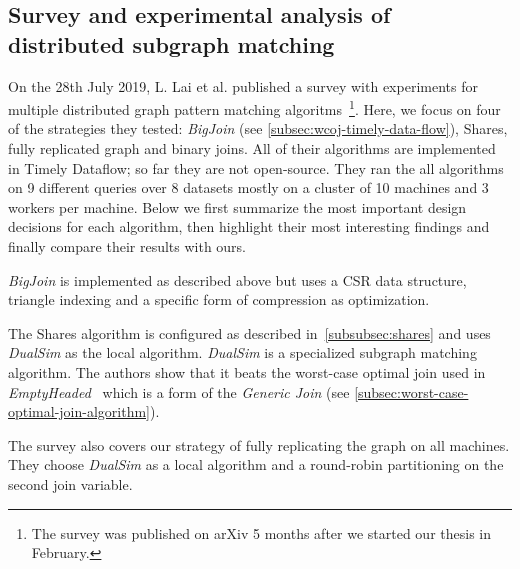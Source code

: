 


\subsection{Survey and experimental analysis of distributed subgraph matching}
On the 28th July 2019, L. Lai et al. published a survey with experiments for multiple
distributed graph pattern matching algoritms~\cite{longbin}\footnote{The survey was published on arXiv 5 months after we started our
thesis in
February.}.
Here, we focus on four of the strategies they tested: \textit{BigJoin} (see \cref{subsec:wcoj-timely-data-flow}),
Shares, fully replicated graph and binary joins.
All of their algorithms are implemented in Timely Dataflow;
so far they are not open-source.
They ran the all algorithms on 9 different queries over 8 datasets mostly on a cluster of 10 machines
and 3 workers per machine.
Below we first summarize the most important design decisions for each algorithm, then
highlight their most interesting findings and finally compare their results with ours.

\textit{BigJoin} is implemented as described above but uses a \textsc{CSR} data structure,
triangle indexing and a specific form of compression as optimization.

The Shares algorithm is configured as described in~\cref{subsubsec:shares} and uses
\textit{DualSim} as the local algorithm.
\textit{DualSim} is a specialized subgraph matching algorithm.
The authors show that it beats the worst-case optimal join used in \textit{EmptyHeaded}~\cite{emptyheaded}
which is a form of the \textit{Generic Join} (see \cref{subsec:worst-case-optimal-join-algorithm}).

The survey also covers our strategy of fully replicating the graph on all machines.
They choose \textit{DualSim} as a local algorithm and a round-robin partitioning on the
second join variable.


